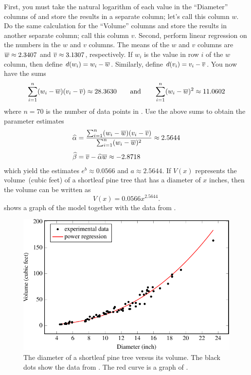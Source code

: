\documentclass[a4paper,oneside,12pt]{article}
\begin{document}
\begin{solution}
First, you must take the natural logarithm of each value in the
``Diameter'' columns of  and store the
results in a separate column; let's call this column $w$.  Do the same
calculation for the ``Volume'' columns and store the results in
another separate column; call this column $v$.  Second, perform linear
regression on the numbers in the $w$ and $v$ columns.  The means of
the $w$ and $v$ columns are $\overline{w} \approx 2.3407$ and
$\overline{v} \approx 3.1307$, respectively.  If $w_i$ is the value in row
$i$ of the $w$ column, then define $d(w_i) = w_i - \overline{w}$.  Similarly,
define $d(v_i) = v_i - \overline{v}$.  You now have the sums
\[
\sum_{i=1}^n (w_i - \overline{w}) (v_i - \overline{v})
\approx
28.3630
\qquad
\text{and}
\qquad
\sum_{i=1}^n (w_i - \overline{w})^2
\approx
11.0602
\]
where $n = 70$ is the number of data points in
.  Use the above sums to obtain the
parameter estimates
\begin{align*}
\widehat{\alpha}
&=
\frac{
  \sum_{i=1}^n (w_i - \overline{w}) (v_i - \overline{v})
}{
  \sum_{i=1}^n (w_i - \overline{w})^2
}
\approx
2.5644 \\[4pt]
\widehat{\beta}
&=
\overline{v} - \widehat{\alpha} \overline{w}
\approx
-2.8718
\end{align*}
which yield the estimates $e^b \approx 0.0566$ and
$a \approx 2.5644$.  If $V(x)$ represents the volume~(cubic feet) of a
shortleaf pine tree that has a diameter of $x$ inches, then the volume
can be written as
\begin{equation}
\label{eqn:logarithm:shortleaf_volume}
V(x)
=
0.0566 x^{2.5644}.
\end{equation}
 shows a graph of the model
together with the data from .

\begin{figure}[!htbp]
\centering
\includegraphics[scale=1.1]{image/12/shortleaf.pdf}
\caption{%
  The diameter of a shortleaf pine tree versus its volume.  The black
  dots show the data from .  The red
  curve is a graph of .
}
\label{fig:logarithm:shortleaf_volume}
\end{figure}


\end{solution}
\end{document}
